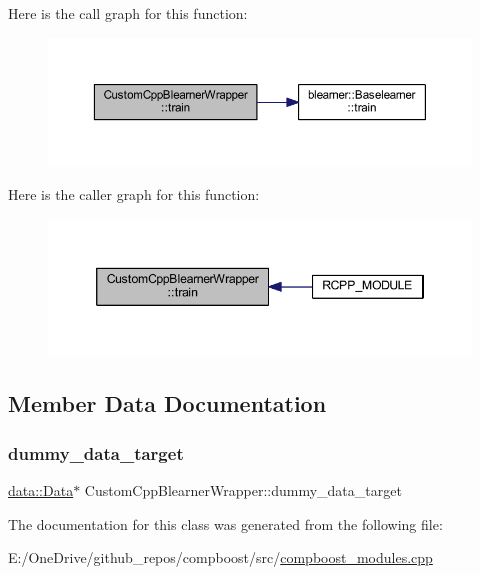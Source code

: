 Here is the call graph for this function\+:\nopagebreak
\begin{figure}[H]
\begin{center}
\leavevmode
\includegraphics[width=350pt]{class_custom_cpp_blearner_wrapper_a84d08ce4754955b5d6ee2e4a66b5b6bc_cgraph}
\end{center}
\end{figure}
Here is the caller graph for this function\+:\nopagebreak
\begin{figure}[H]
\begin{center}
\leavevmode
\includegraphics[width=346pt]{class_custom_cpp_blearner_wrapper_a84d08ce4754955b5d6ee2e4a66b5b6bc_icgraph}
\end{center}
\end{figure}


\subsection{Member Data Documentation}
\mbox{\label{class_custom_cpp_blearner_wrapper_aa7cf022cc61378629f25ba1727c81fe1}} 
\subsubsection{\texorpdfstring{dummy\+\_\+data\+\_\+target}{dummy\_data\_target}}
{\footnotesize\ttfamily \mbox{\hyperlink{classdata_1_1_data}{data\+::\+Data}}$\ast$ Custom\+Cpp\+Blearner\+Wrapper\+::dummy\+\_\+data\+\_\+target\hspace{0.3cm}{\ttfamily [private]}}



The documentation for this class was generated from the following file\+:\begin{DoxyCompactItemize}
\item 
E\+:/\+One\+Drive/github\+\_\+repos/compboost/src/\mbox{\hyperlink{compboost__modules_8cpp}{compboost\+\_\+modules.\+cpp}}\end{DoxyCompactItemize}
